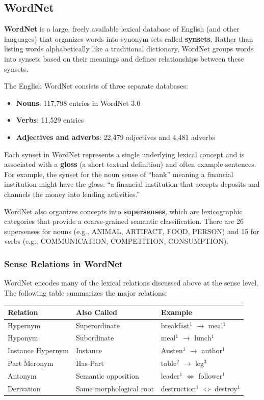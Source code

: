 \documentclass[11pt,a4paper]{article}
\begin{document}
\subsection{WordNet}

\textbf{WordNet} is a large, freely available lexical database of English (and other languages) that organizes words into synonym sets called \textbf{synsets}. Rather than listing words alphabetically like a traditional dictionary, WordNet groups words into synsets based on their meanings and defines relationships between these synsets.

The English WordNet consists of three separate databases:
\begin{itemize}
    \item \textbf{Nouns}: 117,798 entries in WordNet 3.0
    \item \textbf{Verbs}: 11,529 entries
    \item \textbf{Adjectives and adverbs}: 22,479 adjectives and 4,481 adverbs
\end{itemize}

Each synset in WordNet represents a single underlying lexical concept and is associated with a \textbf{gloss} (a short textual definition) and often example sentences. For example, the synset for the noun sense of ``bank'' meaning a financial institution might have the gloss: ``a financial institution that accepts deposits and channels the money into lending activities.''

WordNet also organizes concepts into \textbf{supersenses}, which are lexicographic categories that provide a coarse-grained semantic classification. There are 26 supersenses for nouns (e.g., ANIMAL, ARTIFACT, FOOD, PERSON) and 15 for verbs (e.g., COMMUNICATION, COMPETITION, CONSUMPTION).

\subsubsection{Sense Relations in WordNet}

WordNet encodes many of the lexical relations discussed above at the sense level. The following table summarizes the major relations:
\begin{center}
\begin{tabular}{|l|l|l|}
\hline
\textbf{Relation} & \textbf{Also Called} & \textbf{Example} \\ \hline
Hypernym & Superordinate & breakfast$^1$ $\to$ meal$^1$ \\ \hline
Hyponym & Subordinate & meal$^1$ $\to$ lunch$^1$ \\ \hline
Instance Hypernym & Instance & Austen$^1$ $\to$ author$^1$ \\ \hline
Part Meronym & Has-Part & table$^2$ $\to$ leg$^3$ \\ \hline
Antonym & Semantic opposition & leader$^1$ $\Leftrightarrow$ follower$^1$ \\ \hline
Derivation & Same morphological root & destruction$^1$ $\Leftrightarrow$ destroy$^1$ \\ \hline
\end{tabular}
\end{center}
\end{document}
